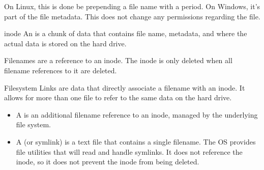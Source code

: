 \documentclass[12pt]{report}
\begin{document}
On Linux, this is done be prepending a file name with a period. On Windows, it's part of the file metadata. This does not change any permissions regarding the file.

\begin{dfnbox}{inode}{}
    An  is a chunk of data that contains file name, metadata, and where the actual data is stored on the hard drive.
\end{dfnbox}

Filenames are a reference to an inode. The inode is only deleted when all filename references to it are deleted.

\begin{dfnbox}{Filesystem Links}{}
     are data that directly associate a filename with an inode. It allows for more than one file to refer to the same data on the hard drive.
    \begin{itemize}[noitemsep]
        \item A  is an additional filename reference to an inode, managed by the underlying file system.
        \item A  (or symlink) is a text file that contains a single filename. The OS provides file utilities that will read and handle symlinks. It does not reference the inode, so it does not prevent the inode from being deleted.
    \end{itemize}
\end{dfnbox}

\amzindex
\end{document}
